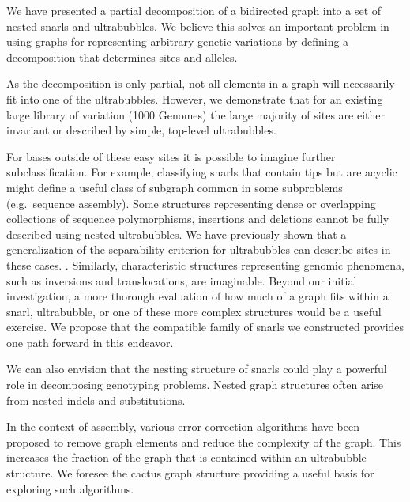 \documentclass[11pt]{ucthesis}
\begin{document}
We have presented a partial decomposition of a bidirected graph into a set of nested snarls and ultrabubbles. We believe this solves an important problem in using graphs for representing arbitrary genetic variations by defining a decomposition that determines sites and alleles. 

As the decomposition is only partial, not all elements in a graph will necessarily fit into one of the ultrabubbles. However, we demonstrate that for an existing large library of variation (1000 Genomes) the large majority of sites are either invariant or described by simple, top-level ultrabubbles. 

For bases outside of these easy sites it is possible to imagine further subclassification. For example, classifying snarls that contain tips but are acyclic might define a useful class of subgraph common in some subproblems (e.g.\ sequence assembly). Some structures representing dense or overlapping collections of sequence polymorphisms, insertions and deletions cannot be fully described using nested ultrabubbles. We have previously shown that a generalization of the separability criterion for ultrabubbles can describe sites in these cases. \cite{Rosen2017}. Similarly, characteristic structures representing genomic phenomena, such as inversions and translocations, are imaginable. Beyond our initial investigation, a more thorough evaluation of how much of a graph fits within a snarl, ultrabubble, or one of these more complex structures would be a useful exercise. We propose that the compatible family of snarls we constructed provides one path forward in this endeavor.


We can also envision that the nesting structure of snarls could play a powerful role in decomposing genotyping problems. Nested graph structures often arise from nested indels and substitutions. 


In the context of assembly, various error correction algorithms have been proposed to remove graph elements and reduce the complexity of the graph. This increases the fraction of the graph that is contained within an ultrabubble structure. We foresee the cactus graph structure providing a useful basis for exploring such algorithms. 
\end{document}
